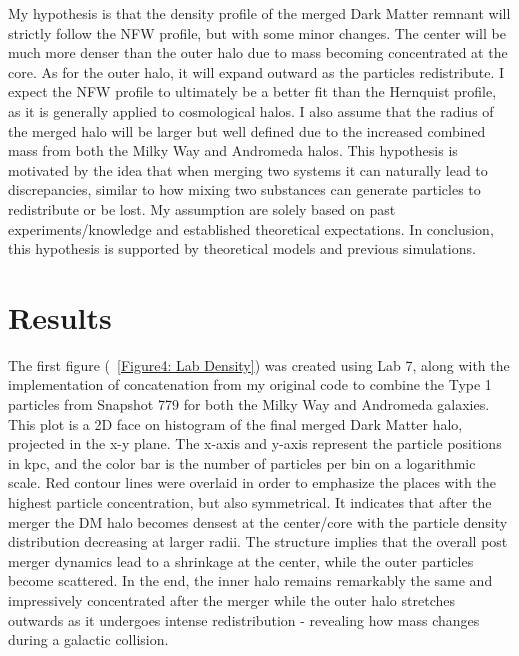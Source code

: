\documentclass[fleqn,usenatbib]{mnras}
\begin{document}
My hypothesis is that the density profile of the merged Dark Matter remnant will strictly follow the NFW profile, but with some minor changes. The center will be much more denser than the outer halo due to mass becoming concentrated at the core. As for the outer halo, it will expand outward as the particles redistribute. I expect the NFW profile to ultimately be a better fit than the Hernquist profile, as it is generally applied to cosmological halos. I also assume that the radius of the merged halo will be larger but well defined due to the increased combined mass from both the Milky Way and Andromeda halos. This hypothesis is motivated by the idea that when merging two systems it can naturally lead to discrepancies, similar to how mixing two substances can generate particles to redistribute or be lost. My assumption are solely based on past experiments/knowledge and established theoretical expectations. In conclusion, this hypothesis is supported by theoretical models and previous simulations.

\section{Results}
The first figure (~\ref{Figure4: Lab Density}) was created using Lab 7, along with the implementation of concatenation from my original code to combine the Type 1 particles from Snapshot 779 for both the Milky Way and Andromeda galaxies. This plot is a 2D face on histogram of the final merged Dark Matter halo, projected in the x-y plane. The x-axis and y-axis represent the particle positions in kpc, and the color bar is the number of particles per bin on a logarithmic scale. Red contour lines were overlaid in order to emphasize the places with the highest particle concentration, but also symmetrical. It indicates that after the merger the DM halo becomes densest at the center/core with the particle density distribution decreasing at larger radii. The structure implies that the overall post  merger dynamics lead to a shrinkage at the center, while the outer particles become scattered. In the end, the inner halo remains remarkably the same and impressively concentrated after the merger while the outer halo stretches outwards as it undergoes intense redistribution - revealing how mass changes during a galactic collision.
\end{document}

